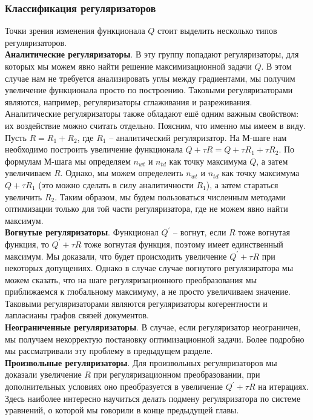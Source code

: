 \documentclass[12pt]{article}
\begin{document}
           \subsubsection{Классификация регуляризаторов}
Точки зрения изменения функционала $Q$ стоит выделить несколько типов регуляризаторов.\\
	 \textbf{Аналитические регуляризаторы}. В эту группу попадают регуляризаторы, для которых мы можем явно найти решение максимизационной задачи $Q$. В этом случае нам не требуется анализировать углы между градиентами, мы получим увеличение функционала просто по построению. Таковыми регуляризаторами являются, например, регуляризаторы сглаживания и разреживания. Аналитические регуляризаторы также обладают ешё одним важным свойством: их воздействие можно считать отдельно. Поясним, что именно мы имеем в виду. Пусть $R = R_1 + R_2$, где $R_1$ -- аналитический регуляризатор. На М-шаге нам необходимо построить увеличение функционала $Q + \tau R = Q + \tau R_1 + \tau R_2$. По формулам М-шага мы определяем $n_{wt}$ и $n_{td}$ как точку максимума $Q$, а затем увеличиваем $R$.  Однако, мы можем определеить $n_{wt}$ и $n_{td}$ как точку максимума $Q + \tau R_1 $ (это можно сделать в силу аналитичности $R_1$), а затем стараться увеличить $R_2$. Таким образом, мы будем пользоваться численным методами оптимизации только для той части регуляризатора, где не можем явно найти максимум.\\
	\textbf{Вогнутые регуляризаторы}. Функционал $Q^{\prime}$ -- вогнут, если $R$ тоже вогнутая функция, то $Q^{\prime} + \tau R$ тоже вогнутая функция, поэтому имеет единственный максимум. Мы доказали, что будет происходить увеличение $Q^{\prime} + \tau R$ при некоторых допущениях. Однако в случае случае вогнутого регулязиратора мы можем сказать, что на шаге регуляризационного преобразования мы приближаемся к глобальному максимуму, а не просто увеличиваем значение. Таковыми регуляризаторами являются регуляризаторы когерентности и лапласианы графов связей документов.\\
	\textbf{Неограниченные регуляризаторы}. В случае, если регуляризатор неограничен, мы получаем некорректую постановку оптимизационной задачи. Более подробно мы рассматривали эту проблему в предыдущем разделе.\\
	\textbf{Произвольные регуляризаторы}. Для произвольных регуляризаторов мы доказали увеличение $R$ при регуляризационном преобразовании, при дополнительных условиях оно преобразуется в увеличение $Q^{\prime} + \tau R$ на итерациях. Здесь наиболее интересно научиться делать подмену регуляризатора по системе уравнений, о которой мы говорили в конце предыдущей главы.
\end{document}
